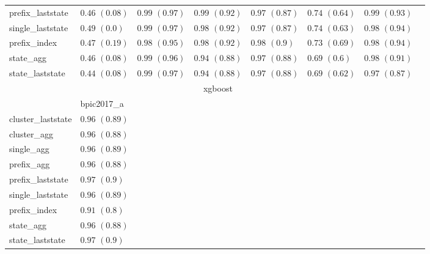 \documentclass[twoside,11pt]{Latex/Classes/PhDthesisPSnPDF}
\begin{document}
\begin{table}[h]
{\begin{tabular}{llllllll}
				prefix\_laststate & $0.46$ ${(0.08)}$ & $\mathbf{0.99}$ $\mathbf{(0.97)}$  & $0.99$ ${(0.92)}$ & $0.97$ ${(0.87)}$ & $0.74$ ${(0.64)}$ & $0.99$ ${(0.93)}$ \\
				single\_laststate & $0.49$ ${(0.0)}$ & $\mathbf{0.99}$ $\mathbf{(0.97)}$  & $\mathbf{0.98}$ $\mathbf{(0.92)}$  & $0.97$ ${(0.87)}$ & $0.74$ ${(0.63)}$ & $\mathbf{0.98}$ $\mathbf{(0.94)}$  \\
				prefix\_index & $0.47$ ${(0.19)}$ & $0.98$ ${(0.95)}$ & $\mathbf{0.98}$ $\mathbf{(0.92)}$  & $\mathbf{0.98}$ $\mathbf{(0.9)}$  & $0.73$ ${(0.69)}$ & $\mathbf{0.98}$ $\mathbf{(0.94)}$  \\
				state\_agg & $0.46$ ${(0.08)}$ & $\mathbf{0.99}$ $\mathbf{(0.96)}$  & $0.94$ ${(0.88)}$ & $0.97$ ${(0.88)}$ & $0.69$ ${(0.6)}$ & $0.98$ ${(0.91)}$ \\
				state\_laststate & $0.44$ ${(0.08)}$ & $\mathbf{0.99}$ $\mathbf{(0.97)}$  & $0.94$ ${(0.88)}$ & $0.97$ ${(0.88)}$ & $0.69$ ${(0.62)}$ & $0.97$ ${(0.87)}$ \\
				\bottomrule
				\toprule
				& \multicolumn{5}{c}{xgboost}
				\\
				& bpic2017\_a
				\\ \midrule
				cluster\_laststate & $0.96$ ${(0.89)}$ \\
				cluster\_agg & $0.96$ ${(0.88)}$ \\
				single\_agg & $0.96$ ${(0.89)}$ \\
				prefix\_agg & $0.96$ ${(0.88)}$ \\
				prefix\_laststate & $\mathbf{0.97}$ $\mathbf{(0.9)}$  \\
				single\_laststate & $0.96$ ${(0.89)}$ \\
				prefix\_index & $0.91$ ${(0.8)}$ \\
				state\_agg & $0.96$ ${(0.88)}$ \\
				state\_laststate & $\mathbf{0.97}$ $\mathbf{(0.9)}$  \\
				\bottomrule
			
		\end{tabular}%
	}
\end{table}
\end{document}
